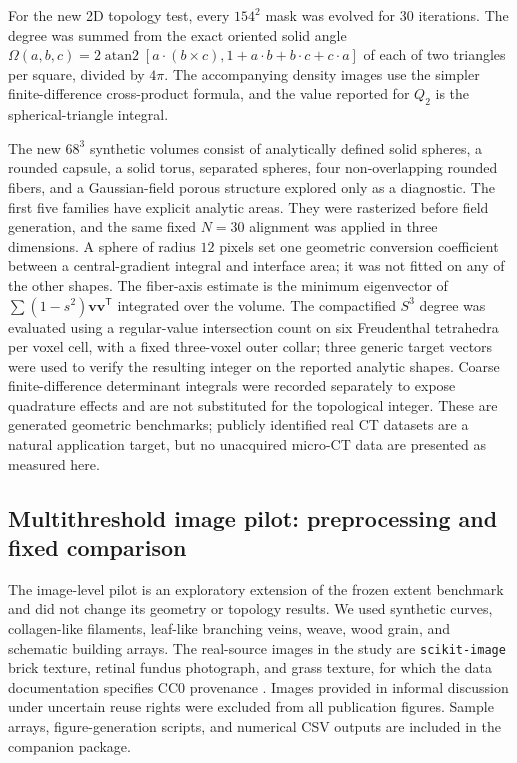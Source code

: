 \documentclass[11pt,a4paper]{article}
\newcommand{\vv}{\bm v}
\begin{document}
For the new 2D topology test, every $154^2$ mask was evolved for 30 iterations. The degree was summed from the exact oriented solid angle $\Omega(a,b,c)=2\operatorname{atan2}[a\cdot(b\times c),1+a\cdot b+b\cdot c+c\cdot a]$ of each of two triangles per square, divided by $4\pi$. The accompanying density images use the simpler finite-difference cross-product formula, and the value reported for $Q_2$ is the spherical-triangle integral.

The new $68^3$ synthetic volumes consist of analytically defined solid spheres, a rounded capsule, a solid torus, separated spheres, four non-overlapping rounded fibers, and a Gaussian-field porous structure explored only as a diagnostic. The first five families have explicit analytic areas. They were rasterized before field generation, and the same fixed $N=30$ alignment was applied in three dimensions. A sphere of radius $12$ pixels set one geometric conversion coefficient between a central-gradient integral and interface area; it was not fitted on any of the other shapes. The fiber-axis estimate is the minimum eigenvector of $\sum(1-s^2)\vv\vv^{\mathsf T}$ integrated over the volume. The compactified $S^3$ degree was evaluated using a regular-value intersection count on six Freudenthal tetrahedra per voxel cell, with a fixed three-voxel outer collar; three generic target vectors were used to verify the resulting integer on the reported analytic shapes. Coarse finite-difference determinant integrals were recorded separately to expose quadrature effects and are not substituted for the topological integer. These are generated geometric benchmarks; publicly identified real CT datasets are a natural application target, but no unacquired micro-CT data are presented as measured here.

\subsection{Multithreshold image pilot: preprocessing and fixed comparison}
The image-level pilot is an exploratory extension of the frozen extent benchmark and did not change its geometry or topology results. We used synthetic curves, collagen-like filaments, leaf-like branching veins, weave, wood grain, and schematic building arrays. The real-source images in the study are \texttt{scikit-image} brick texture, retinal fundus photograph, and grass texture, for which the data documentation specifies CC0 provenance \cite{VanderWalt2014}. Images provided in informal discussion under uncertain reuse rights were excluded from all publication figures. Sample arrays, figure-generation scripts, and numerical CSV outputs are included in the companion package.
\end{document}
